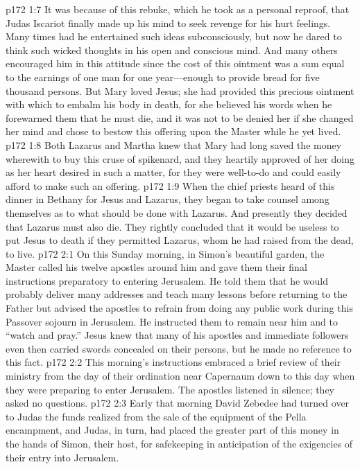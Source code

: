 \vs p172 1:7 It was because of this rebuke, which he took as a personal reproof, that Judas Iscariot finally made up his mind to seek revenge for his hurt feelings. Many times had he entertained such ideas subconsciously, but now he dared to think such wicked thoughts in his open and conscious mind. And many others encouraged him in this attitude since the cost of this ointment was a sum equal to the earnings of one man for one year---enough to provide bread for five thousand persons. But Mary loved Jesus; she had provided this precious ointment with which to embalm his body in death, for she believed his words when he forewarned them that he must die, and it was not to be denied her if she changed her mind and chose to bestow this offering upon the Master while he yet lived.
\vs p172 1:8 Both Lazarus and Martha knew that Mary had long saved the money wherewith to buy this cruse of spikenard, and they heartily approved of her doing as her heart desired in such a matter, for they were well\hyp{}to\hyp{}do and could easily afford to make such an offering.
\vs p172 1:9 When the chief priests heard of this dinner in Bethany for Jesus and Lazarus, they began to take counsel among themselves as to what should be done with Lazarus. And presently they decided that Lazarus must also die. They rightly concluded that it would be useless to put Jesus to death if they permitted Lazarus, whom he had raised from the dead, to live.
\vs p172 2:1 On this Sunday morning, in Simon’s beautiful garden, the Master called his twelve apostles around him and gave them their final instructions preparatory to entering Jerusalem. He told them that he would probably deliver many addresses and teach many lessons before returning to the Father but advised the apostles to refrain from doing any public work during this Passover sojourn in Jerusalem. He instructed them to remain near him and to \textcolor{ubdarkred}{“watch and pray.”} Jesus knew that many of his apostles and immediate followers even then carried swords concealed on their persons, but he made no reference to this fact.
\vs p172 2:2 This morning’s instructions embraced a brief review of their ministry from the day of their ordination near Capernaum down to this day when they were preparing to enter Jerusalem. The apostles listened in silence; they asked no questions.
\vs p172 2:3 Early that morning David Zebedee had turned over to Judas the funds realized from the sale of the equipment of the Pella encampment, and Judas, in turn, had placed the greater part of this money in the hands of Simon, their host, for safekeeping in anticipation of the exigencies of their entry into Jerusalem.
